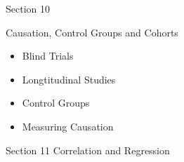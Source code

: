 Section 10

Causation, Control Groups and Cohorts

\begin{itemize}
\item Blind Trials
\item Longtitudinal Studies
\item Control Groups
\item Measuring Causation
\end{itemize}


Section 11 Correlation and Regression
